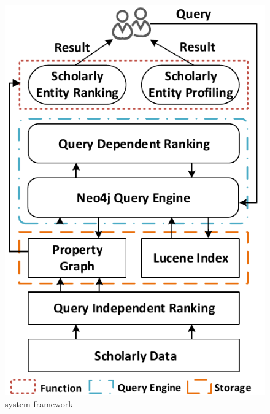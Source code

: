 \begin{figure}
\centering
\includegraphics[width=\columnwidth]{systemFrame.pdf}
\caption{system framework}
\label{fig:frame}
\end{figure}


